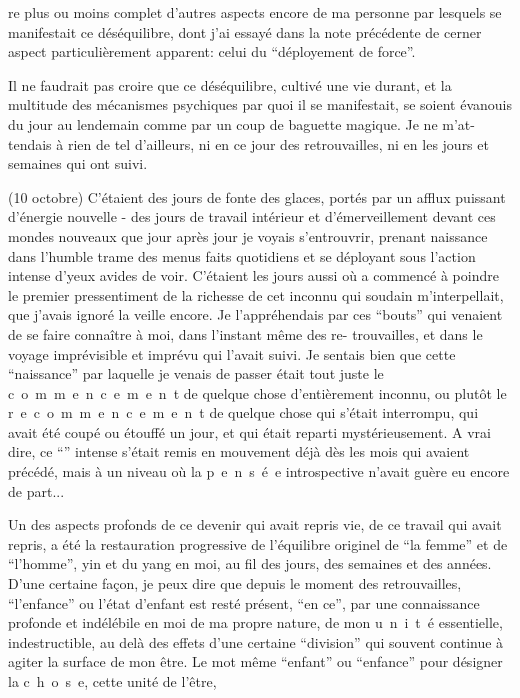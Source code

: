 re plus ou moins complet d'autres aspects encore de ma personne par lesquels se
manifestait ce déséquilibre, dont j'ai essayé dans la note précédente de cerner
aspect particulièrement apparent: celui du ``déployement de force''.

Il ne faudrait pas croire que ce déséquilibre, cultivé une vie durant,
et la multitude des mécanismes psychiques par quoi il se manifestait, se soient
évanouis du jour au lendemain comme par un coup de baguette magique. Je ne m'at-\linebreak
tendais à rien de tel d'ailleurs, ni en ce jour des retrouvailles, ni en les
jours et semaines qui ont suivi.

(10 octobre) C'étaient des jours de fonte des glaces, portés par un afflux
puissant d'énergie nouvelle - des jours de travail intérieur et d'émerveillement
devant ces mondes nouveaux que jour après jour je voyais s'entrouvrir, prenant
naissance dans l'humble trame des menus faits quotidiens et se déployant sous
l'action intense d'yeux avides de voir. C'étaient les jours aussi où a commencé
à poindre le premier pressentiment de la richesse de cet inconnu qui soudain
m'interpellait, que j'avais ignoré la veille encore. Je l'appréhendais par ces
``bouts'' qui venaient de se faire connaître à moi, dans l'instant même des re-\linebreak
trouvailles, et dans le voyage imprévisible et imprévu qui l'avait suivi. Je
sentais bien que cette ``naissance'' par laquelle je venais de passer était tout
juste le \mbox{c o m m e n c e m e n t} de quelque chose d'entièrement inconnu, ou
plutôt le \mbox{r e c o m m e n c e m e n t} de quelque chose qui s'était interrompu,
qui avait été coupé ou étouffé un jour, et qui était reparti mystérieusement.
A vrai dire, ce ``'' intense s'était remis en mouvement déjà dès les mois
qui avaient précédé, mais à un niveau où la \mbox{p e n s é e} introspective
n'avait guère eu encore de part...

Un des aspects profonds de ce devenir qui avait repris vie, de ce travail
qui avait repris, a été la restauration progressive de l'équilibre originel de
``la femme'' et de ``l'homme'',  yin et du yang en moi, au fil des jours, des
semaines et des années. D'une certaine façon, je peux dire que depuis le moment
des retrouvailles, ``l'enfance'' ou l'état d'enfant est resté présent, ``en \linebreak
ce'', par une connaissance profonde et indélébile en moi de ma propre nature, de
mon \mbox{u n i t é} essentielle, indestructible, au delà des effets d'une certaine
``division'' qui souvent continue à agiter la surface de mon être. Le mot même
``enfant'' ou ``enfance'' pour désigner la \mbox{c h o s e}, cette unité de l'être, 
\margin{\unsure{-}}

